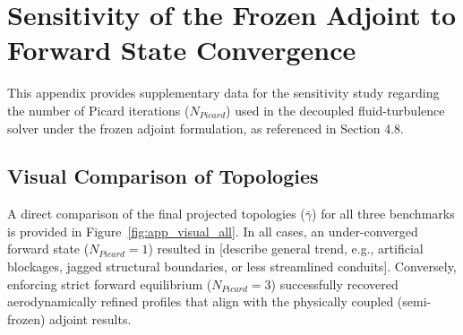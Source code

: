 \chapter{Sensitivity of the Frozen Adjoint to Forward State Convergence}
\label{app:picard_sensitivity}

This appendix provides supplementary data for the sensitivity study regarding the number of Picard iterations ($N_{Picard}$) used in the decoupled fluid-turbulence solver under the frozen adjoint formulation, as referenced in Section 4.8. 

\section{Visual Comparison of Topologies}
A direct comparison of the final projected topologies ($\bar{\gamma}$) for all three benchmarks is provided in Figure~\ref{fig:app_visual_all}. In all cases, an under-converged forward state ($N_{Picard} = 1$) resulted in [describe general trend, e.g., artificial blockages, jagged structural boundaries, or less streamlined conduits]. Conversely, enforcing strict forward equilibrium ($N_{Picard} = 3$) successfully recovered aerodynamically refined profiles that align with the physically coupled (semi-frozen) adjoint results.

